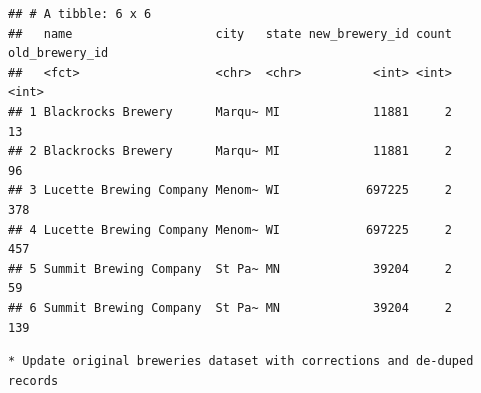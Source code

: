 \documentclass[]{article}
\newenvironment{Shaded}{\begin{snugshade}}{\end{snugshade}}
\newcommand{\KeywordTok}[1]{\textcolor[rgb]{0.13,0.29,0.53}{\textbf{#1}}}
\newcommand{\DataTypeTok}[1]{\textcolor[rgb]{0.13,0.29,0.53}{#1}}
\newcommand{\StringTok}[1]{\textcolor[rgb]{0.31,0.60,0.02}{#1}}
\newcommand{\CommentTok}[1]{\textcolor[rgb]{0.56,0.35,0.01}{\textit{#1}}}
\newcommand{\OperatorTok}[1]{\textcolor[rgb]{0.81,0.36,0.00}{\textbf{#1}}}
\newcommand{\NormalTok}[1]{#1}
\begin{document}
\begin{verbatim}
## # A tibble: 6 x 6
##   name                    city   state new_brewery_id count old_brewery_id
##   <fct>                   <chr>  <chr>          <int> <int>          <int>
## 1 Blackrocks Brewery      Marqu~ MI             11881     2             13
## 2 Blackrocks Brewery      Marqu~ MI             11881     2             96
## 3 Lucette Brewing Company Menom~ WI            697225     2            378
## 4 Lucette Brewing Company Menom~ WI            697225     2            457
## 5 Summit Brewing Company  St Pa~ MN             39204     2             59
## 6 Summit Brewing Company  St Pa~ MN             39204     2            139
\end{verbatim}

\begin{verbatim}
* Update original breweries dataset with corrections and de-duped records
\end{verbatim}

\begin{Shaded}
\end{Shaded}
\end{document}
